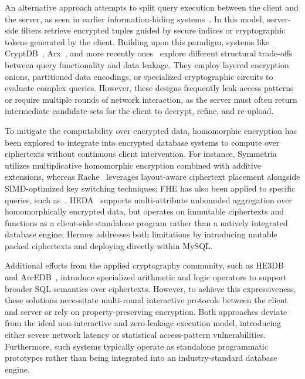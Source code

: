 \documentclass[sigconf,nonacm]{acmart}
\begin{document}
An alternative approach attempts to split query execution between the client and the server, as seen in earlier information-hiding systems~\cite{hhaci_sigmod02}. In this model, server-side filters retrieve encrypted tuples guided by secure indices or cryptographic tokens generated by the client. Building upon this paradigm, systems like CryptDB~\cite{popa2011cryptdb}, Arx~\cite{arx_vldb19}, and more recently ones~\cite{xge_tkde26,vthak_sigmod25,slv_tkde25,qxu_tkde25,tshen_tkde25,msha_sigmod24,lzheng_vldb24,szhang_icde24,rwei_vldb23,xcao_vldb23,vvo_tkde23,qtong_tkde23,yzheng_tkde23,ffalzon_vldb22,xren_vldb22,mshaf_icde22} explore different structural trade-offs between query functionality and data leakage. They employ layered encryption onions, partitioned data encodings, or specialized cryptographic circuits to evaluate complex queries. However, these designs frequently leak access patterns or require multiple rounds of network interaction, as the server must often return intermediate candidate sets for the client to decrypt, refine, and re-upload.

To mitigate the computability over encrypted data, homomorphic encryption has been explored to integrate into encrypted database systems to compute over ciphertexts without continuous client intervention. For instance, Symmetria~\cite{symmetria_vldb20} utilizes multiplicative homomorphic encryption combined with additive extensions, whereas Rache~\cite{otawose_sigmod23} leverages layout-aware ciphertext placement alongside SIMD-optimized key switching techniques; FHE has also been applied to specific queries, such as~\cite{sjum_tkde23,tpar_tkde23,zwang_tkde23,wyang_tkde22,rli_tkde22}. 
HEDA~\cite{xren_vldb22} supports multi-attribute unbounded aggregation over homomorphically encrypted data, 
but operates on immutable ciphertexts and functions as a client-side standalone program rather than a natively integrated database engine; Hermes addresses both limitations by introducing mutable packed ciphertexts and deploying directly within MySQL.

Additional efforts from the applied cryptography community, such as HE3DB~\cite{10.1145/3576915.3616608} and ArcEDB~\cite{10.1145/3658644.3670384}, introduce specialized arithmetic and logic operators to support broader SQL semantics over ciphertexts. However, to achieve this expressiveness, these solutions necessitate multi-round interactive protocols between the client and server or rely on property-preserving encryption. Both approaches deviate from the ideal non-interactive and zero-leakage execution model, introducing either severe network latency or statistical access-pattern vulnerabilities. Furthermore, such systems typically operate as standalone programmatic prototypes rather than being integrated into an industry-standard database engine.
\end{document}
